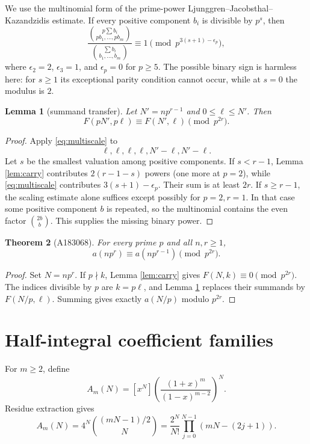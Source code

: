 \documentclass[11pt]{article}
\newtheorem{theorem}{Theorem}[section]
\newtheorem{lemma}[theorem]{Lemma}
\theoremstyle{definition}
\begin{document}
We use the multinomial form of the prime-power
Ljunggren--Jacobsthal--Kazandzidis estimate.  If every positive component
$b_i$ is divisible by $p^s$, then
\begin{equation}\label{eq:multiscale}
 \frac{\binom{p\sum b_i}{pb_1,\ldots,pb_m}}
      {\binom{\sum b_i}{b_1,\ldots,b_m}}
 \equiv1\pmod {p^{3(s+1)-\epsilon_p}},
\end{equation}
where $\epsilon_2=2$, $\epsilon_3=1$, and $\epsilon_p=0$ for $p\geq5$.
The possible binary sign is harmless here: for $s\geq1$ its exceptional
parity condition cannot occur, while at $s=0$ the modulus is $2$.

\begin{lemma}[summand transfer]\label{lem:summand}
Let $N'=np^{r-1}$ and $0\leq\ell\leq N'$.  Then
\[
 F(pN',p\ell)\equiv F(N',\ell)\pmod {p^{2r}}.
\]
\end{lemma}

\begin{proof}
Apply \eqref{eq:multiscale} to
\[
 \ell,\ell,\ell,\ell,N'-\ell,N'-\ell.
\]
Let $s$ be the smallest valuation among positive components.  If
$s<r-1$, Lemma \ref{lem:carry} contributes $2(r-1-s)$ powers (one more at
$p=2$), while \eqref{eq:multiscale} contributes
$3(s+1)-\epsilon_p$.  Their sum is at least $2r$.  If $s\geq r-1$,
the scaling estimate alone suffices except possibly for $p=2,r=1$.
In that case some positive component $b$ is repeated, so the multinomial
contains the even factor $\binom{2b}{b}$.  This supplies the missing binary
power.
\end{proof}

\begin{theorem}[A183068]\label{thm:a183068}
For every prime $p$ and all $n,r\geq1$,
\[
 a(np^r)\equiv a(np^{r-1})\pmod {p^{2r}}.
\]
\end{theorem}

\begin{proof}
Set $N=np^r$.  If $p\nmid k$, Lemma \ref{lem:carry} gives
$F(N,k)\equiv0\pmod {p^{2r}}$.  The indices divisible by $p$ are
$k=p\ell$, and Lemma \ref{lem:summand} replaces their summands by
$F(N/p,\ell)$.  Summing gives exactly $a(N/p)$ modulo $p^{2r}$.
\end{proof}

\section{Half-integral coefficient families}

For $m\geq2$, define
\[
 A_m(N)=[x^N]\left(\frac{(1+x)^m}{(1-x)^{m-2}}\right)^N.
\]
Residue extraction gives
\begin{equation}\label{eq:oddunitform}
 A_m(N)=4^N\binom{(mN-1)/2}{N}
 =\frac{2^N}{N!}\prod_{j=0}^{N-1}(mN-(2j+1)).
\end{equation}
\end{document}
